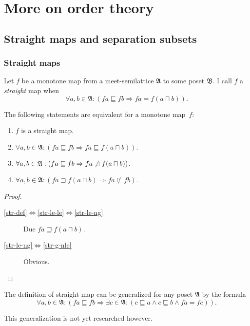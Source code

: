 
\chapter{More on order theory}


\section{Straight maps and separation subsets}


\subsection{Straight maps}
\begin{defn}
Let $f$ be a monotone map from a meet-semilattice
$\mathfrak{A}$ to some poset $\mathfrak{B}$. I call $f$ a \emph{straight}
map when
\[
\forall a,b\in\mathfrak{A}:(fa\sqsubseteq fb\Rightarrow fa=f(a\sqcap b)).
\]
\end{defn}
\begin{prop}
The following statements are equivalent for a monotone map~$f$:
\begin{enumerate}
\item \label{str-def}$f$ is a straight map.
\item \label{str-le-le}$\forall a,b\in\mathfrak{A}:(fa\sqsubseteq fb\Rightarrow fa\sqsubseteq f(a\sqcap b))$.
\item \label{str-le-ng}$\forall a,b\in\mathfrak{A}:(fa\sqsubseteq fb\Rightarrow fa\not\sqsupset f(a\sqcap b))$.
\item \label{str-g-nle}$\forall a,b\in\mathfrak{A}:(fa\sqsupset f(a\sqcap b)\Rightarrow fa\nsqsubseteq fb)$.
\end{enumerate}
\end{prop}
\begin{proof}
~
\begin{description}
\item [{\ref{str-def}$\Leftrightarrow$\ref{str-le-le}$\Leftrightarrow$\ref{str-le-ng}}] Due
$fa\sqsupseteq f(a\sqcap b)$.
\item [{\ref{str-le-ng}$\Leftrightarrow$\ref{str-g-nle}}] Obvious.
\end{description}
\end{proof}
\begin{rem}
The definition of straight map can be generalized for any poset $\mathfrak{A}$
by the formula
\[
\forall a,b\in\mathfrak{A}:(fa\sqsubseteq fb\Rightarrow\exists c\in\mathfrak{A}:(c\sqsubseteq a\land c\sqsubseteq b\land fa=fc)).
\]


This generalization is not yet researched however.\end{rem}
